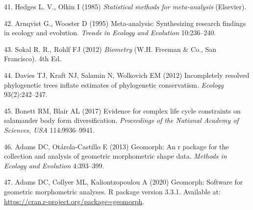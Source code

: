 \documentclass[9pt,twocolumn,twoside,lineno]{pnas-new}
\begin{document}
\leavevmode\hypertarget{ref-HedgesOlkin1985}{}%
41. Hedges L. V., Olkin I (1985) \emph{Statistical methods for
meta-analysis} (Elsevier).

\leavevmode\hypertarget{ref-Arnqvist1995}{}%
42. Arnqvist G., Wooster D (1995) Meta-analysis: Synthesizing research
findings in ecology and evolution. \emph{Trends in Ecology and
Evolution} 10:236--240.

\leavevmode\hypertarget{ref-SokalRohlf2012}{}%
43. Sokal R. R., Rohlf FJ (2012) \emph{Biometry} (W.H. Freeman \& Co.,
San Francisco). 4th Ed.

\leavevmode\hypertarget{ref-Davies2012}{}%
44. Davies TJ, Kraft NJ, Salamin N, Wolkovich EM (2012) Incompletely
resolved phylogenetic trees inflate estimates of phylogenetic
conservatism. \emph{Ecology} 93(2):242--247.

\leavevmode\hypertarget{ref-Bonett2017}{}%
45. Bonett RM, Blair AL (2017) Evidence for complex life cycle
constraints on salamander body form diversification. \emph{Proceedings
of the National Academy of Sciences, USA} 114:9936--9941.

\leavevmode\hypertarget{ref-AdamsOtarola2013}{}%
46. Adams DC, Otárola-Castillo E (2013) Geomorph: An r package for the
collection and analysis of geometric morphometric shape data.
\emph{Methods in Ecology and Evolution} 4:393--399.

\leavevmode\hypertarget{ref-AdamsGeomorph}{}%
47. Adams DC, Collyer ML, Kaliontzopoulou A (2020) Geomorph: Software
for geometric morphometric analyses. R package version 3.3.1. Available
at: \url{https://cran.r-project.org/package=geomorph}.



% 
\end{document}
